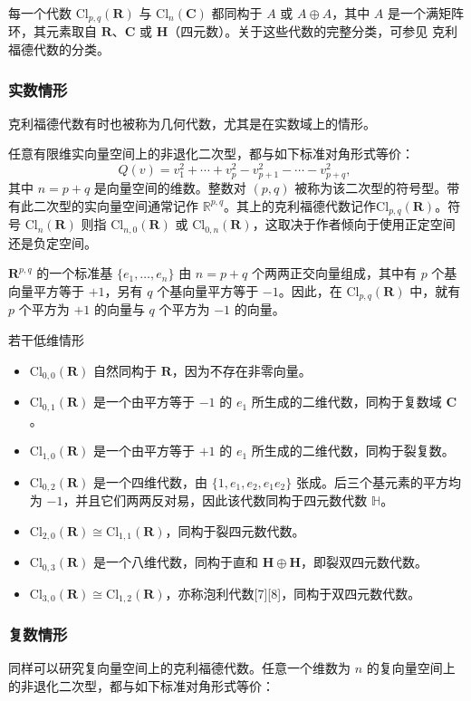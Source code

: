 每一个代数 $\mathrm{Cl}_{p,q}(\mathbf{R})$ 与 $\mathrm{Cl}_{n}(\mathbf{C})$ 都同构于 $A$ 或 $A \oplus A$，其中 $A$ 是一个满矩阵环，其元素取自 $\mathbf{R}$、$\mathbf{C}$ 或 $\mathbf{H}$（四元数）。关于这些代数的完整分类，可参见 克利福德代数的分类。
\subsubsection{实数情形}
克利福德代数有时也被称为几何代数，尤其是在实数域上的情形。

任意有限维实向量空间上的非退化二次型，都与如下标准对角形式等价：
$$
Q(v) = v_1^2 + \cdots + v_p^2 - v_{p+1}^2 - \cdots - v_{p+q}^2,~
$$
其中 $n = p + q$ 是向量空间的维数。整数对 $(p, q)$ 被称为该二次型的符号型。带有此二次型的实向量空间通常记作 $\mathbb{R}^{p,q}$。其上的克利福德代数记作$\mathrm{Cl}_{p,q}(\mathbf{R})$。符号 $\mathrm{Cl}_n(\mathbf{R})$ 则指 $\mathrm{Cl}_{n,0}(\mathbf{R})$ 或 $\mathrm{Cl}_{0,n}(\mathbf{R})$，这取决于作者倾向于使用正定空间还是负定空间。

$\mathbf{R}^{p,q}$ 的一个标准基 $\{e_1, \ldots, e_n\}$ 由 $n = p+q$ 个两两正交向量组成，其中有 $p$ 个基向量平方等于 $+1$，另有 $q$ 个基向量平方等于 $-1$。因此，在 $\mathrm{Cl}_{p,q}(\mathbf{R})$ 中，就有 $p$ 个平方为 $+1$ 的向量与 $q$ 个平方为 $-1$ 的向量。

若干低维情形
\begin{itemize}
\item $\mathrm{Cl}_{0,0}(\mathbf{R})$ 自然同构于 $\mathbf{R}$，因为不存在非零向量。
\item $\mathrm{Cl}_{0,1}(\mathbf{R})$ 是一个由平方等于 $-1$ 的 $e_1$ 所生成的二维代数，同构于复数域 $\mathbf{C}$。
\item $\mathrm{Cl}_{1,0}(\mathbf{R})$ 是一个由平方等于 $+1$ 的 $e_1$ 所生成的二维代数，同构于裂复数。
\item $\mathrm{Cl}_{0,2}(\mathbf{R})$ 是一个四维代数，由 $\{1, e_1, e_2, e_1 e_2\}$ 张成。后三个基元素的平方均为 $-1$，并且它们两两反对易，因此该代数同构于四元数代数 $\mathbb{H}$。
\item $\mathrm{Cl}_{2,0}(\mathbf{R}) \cong \mathrm{Cl}_{1,1}(\mathbf{R})$，同构于裂四元数代数。
\item $\mathrm{Cl}_{0,3}(\mathbf{R})$ 是一个八维代数，同构于直和 $\mathbf{H} \oplus \mathbf{H}$，即裂双四元数代数。
\item $\mathrm{Cl}_{3,0}(\mathbf{R}) \cong \mathrm{Cl}_{1,2}(\mathbf{R})$，亦称泡利代数[7][8]，同构于双四元数代数。
\end{itemize}
\subsubsection{复数情形}
同样可以研究复向量空间上的克利福德代数。任意一个维数为 $n$ 的复向量空间上的非退化二次型，都与如下标准对角形式等价：

